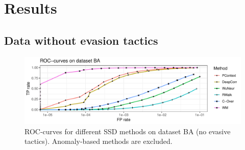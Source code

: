 \documentclass[runningheads,11pt]{llncs}\usepackage[]{graphicx}\usepackage[]{color}
\makeatletter
\def\maxwidth{ %
  \ifdim\Gin@nat@width>\linewidth
    \linewidth
  \else
    \Gin@nat@width
  \fi
}
\newenvironment{knitrout}{}{} %
\makeatother
\begin{document}





\section{Results}\label{Sec:Results}


\subsection{Data without evasion tactics}

\begin{knitrout}
\color{fgcolor}\begin{figure}
\includegraphics[width=\maxwidth]{figure/Noevasion_4nodes-1} \caption[ROC-curves for different SSD methods on dataset BA (no evasive tactics)]{ROC-curves for different SSD methods on dataset BA (no evasive tactics). Anomaly-based methods are excluded.}\label{fig:Noevasion_4nodes}
\end{figure}


\end{knitrout}
\end{document}
